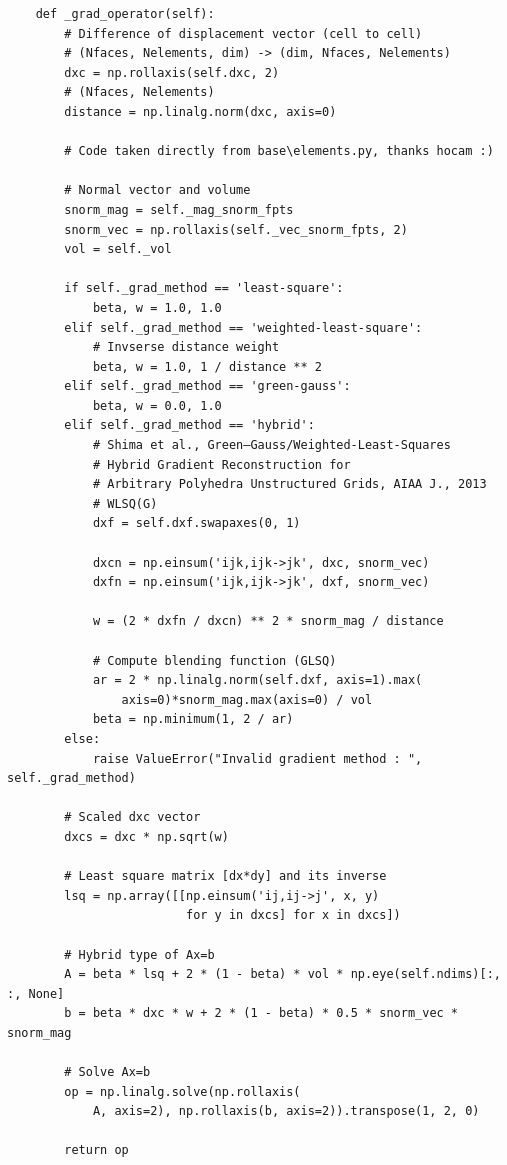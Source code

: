 \documentclass[a4paper, 12pt]{article}
\begin{document}
\begin{verbatim}
    def _grad_operator(self):
        # Difference of displacement vector (cell to cell)
        # (Nfaces, Nelements, dim) -> (dim, Nfaces, Nelements)
        dxc = np.rollaxis(self.dxc, 2)
        # (Nfaces, Nelements)
        distance = np.linalg.norm(dxc, axis=0)

        # Code taken directly from base\elements.py, thanks hocam :)

        # Normal vector and volume
        snorm_mag = self._mag_snorm_fpts
        snorm_vec = np.rollaxis(self._vec_snorm_fpts, 2)
        vol = self._vol

        if self._grad_method == 'least-square':
            beta, w = 1.0, 1.0
        elif self._grad_method == 'weighted-least-square':
            # Invserse distance weight
            beta, w = 1.0, 1 / distance ** 2
        elif self._grad_method == 'green-gauss':
            beta, w = 0.0, 1.0
        elif self._grad_method == 'hybrid':
            # Shima et al., Green–Gauss/Weighted-Least-Squares
            # Hybrid Gradient Reconstruction for
            # Arbitrary Polyhedra Unstructured Grids, AIAA J., 2013
            # WLSQ(G)
            dxf = self.dxf.swapaxes(0, 1)

            dxcn = np.einsum('ijk,ijk->jk', dxc, snorm_vec)
            dxfn = np.einsum('ijk,ijk->jk', dxf, snorm_vec)

            w = (2 * dxfn / dxcn) ** 2 * snorm_mag / distance

            # Compute blending function (GLSQ)
            ar = 2 * np.linalg.norm(self.dxf, axis=1).max(
                axis=0)*snorm_mag.max(axis=0) / vol
            beta = np.minimum(1, 2 / ar)
        else:
            raise ValueError("Invalid gradient method : ", self._grad_method)

        # Scaled dxc vector
        dxcs = dxc * np.sqrt(w)

        # Least square matrix [dx*dy] and its inverse
        lsq = np.array([[np.einsum('ij,ij->j', x, y)
                         for y in dxcs] for x in dxcs])

        # Hybrid type of Ax=b
        A = beta * lsq + 2 * (1 - beta) * vol * np.eye(self.ndims)[:, :, None]
        b = beta * dxc * w + 2 * (1 - beta) * 0.5 * snorm_vec * snorm_mag

        # Solve Ax=b
        op = np.linalg.solve(np.rollaxis(
            A, axis=2), np.rollaxis(b, axis=2)).transpose(1, 2, 0)

        return op
\end{verbatim}
\end{document}

